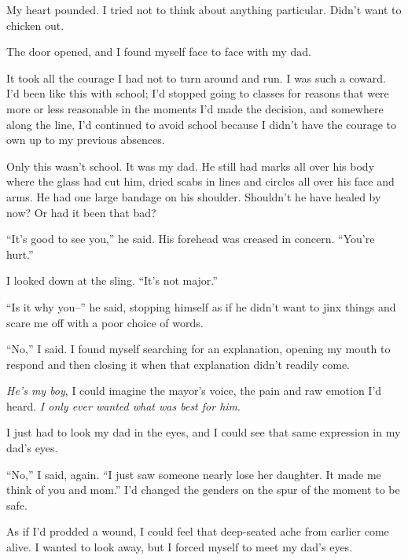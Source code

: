 My heart pounded.  I tried not to think about anything particular.  Didn't want to chicken out.



The door opened, and I found myself face to face with my dad.



It took all the courage I had not to turn around and run.  I was such a coward.  I'd been like this with school; I'd stopped going to classes for reasons that were more or less reasonable in the moments I'd made the decision, and somewhere along the line, I'd continued to avoid school because I didn't have the courage to own up to my previous absences.



Only this wasn't school.  It was my dad.  He still had marks all over his body where the glass had cut him, dried scabs in lines and circles all over his face and arms.  He had one large bandage on his shoulder.  Shouldn't he have healed by now?  Or had it been that bad?



``It's good to see you,'' he said.  His forehead was creased in concern.  ``You're hurt.''



I looked down at the sling.  ``It's not major.''



``Is it why you--'' he said, stopping himself as if he didn't want to jinx things and scare me off with a poor choice of words.



``No,'' I said.  I found myself searching for an explanation, opening my mouth to respond and then closing it when that explanation didn't readily come.



\emph{He's my boy}, I could imagine the mayor's voice, the pain and raw emotion I'd heard.  \emph{I only ever wanted what was best for him}.



I just had to look my dad in the eyes, and I could see that same expression in my dad's eyes.



``No,'' I said, again.  ``I just saw someone nearly lose her daughter.  It made me think of you and mom.''  I'd changed the genders on the spur of the moment to be safe.



As if I'd prodded a wound, I could feel that deep-seated ache from earlier come alive.  I wanted to look away, but I forced myself to meet my dad's eyes.



